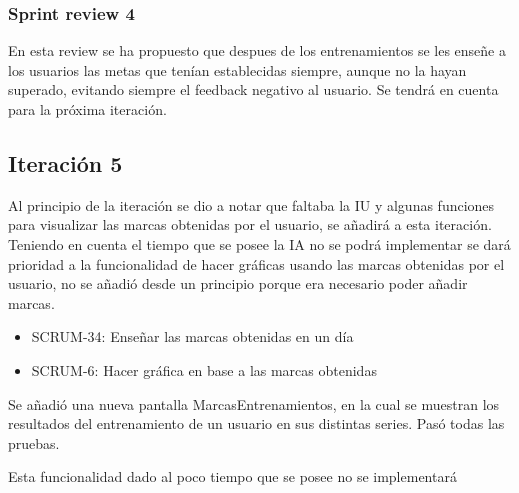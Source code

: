 \subsubsection{Sprint review 4}

En esta review se ha propuesto que despues de los entrenamientos se les enseñe a los usuarios las metas que tenían establecidas siempre, aunque no la hayan superado, evitando siempre el feedback negativo al usuario. Se tendrá en cuenta para la próxima iteración.

\subsection{Iteración 5}

Al principio de la iteración se dio a notar que faltaba la IU y algunas funciones para visualizar las marcas obtenidas por el usuario, se añadirá a esta iteración. Teniendo en cuenta el tiempo que se posee la IA no se podrá implementar se dará prioridad a la funcionalidad de hacer gráficas usando las marcas obtenidas por el usuario, no se añadió desde un principio porque era necesario poder añadir marcas.

\begin{itemize}
	\item SCRUM-34: Enseñar las marcas obtenidas en un día
	\item SCRUM-6: Hacer gráfica en base a las marcas obtenidas
\end{itemize}


Se añadió una nueva pantalla MarcasEntrenamientos, en la cual se muestran los resultados del entrenamiento de un usuario en sus distintas series. Pasó todas las pruebas.


Esta funcionalidad dado al poco tiempo que se posee no se implementará